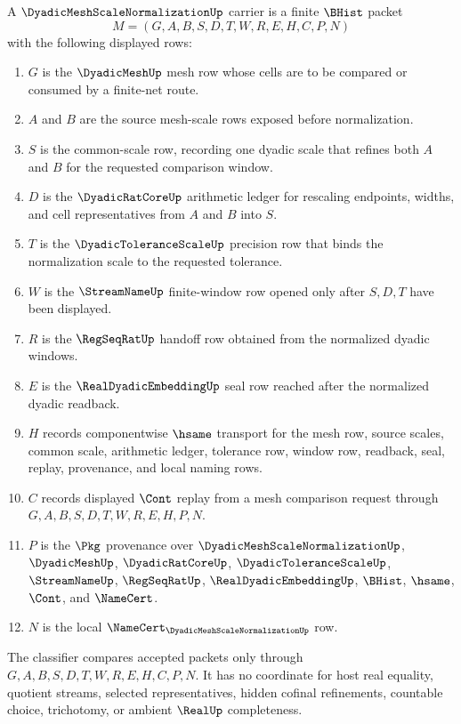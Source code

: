 \begin{definition}
\label{def:dyadic-mesh-scale-normalization-carrier}
A $\DyadicMeshScaleNormalizationUp$ carrier is a finite $\BHist$ packet
$$
M=(G,A,B,S,D,T,W,R,E,H,C,P,N)
$$
with the following displayed rows:
\begin{enumerate}
\item $G$ is the $\DyadicMeshUp$ mesh row whose cells are to be compared or consumed by a finite-net route.
\item $A$ and $B$ are the source mesh-scale rows exposed before normalization.
\item $S$ is the common-scale row, recording one dyadic scale that refines both $A$ and $B$ for the requested comparison window.
\item $D$ is the $\DyadicRatCoreUp$ arithmetic ledger for rescaling endpoints, widths, and cell representatives from $A$ and $B$ into $S$.
\item $T$ is the $\DyadicToleranceScaleUp$ precision row that binds the normalization scale to the requested tolerance.
\item $W$ is the $\StreamNameUp$ finite-window row opened only after $S,D,T$ have been displayed.
\item $R$ is the $\RegSeqRatUp$ handoff row obtained from the normalized dyadic windows.
\item $E$ is the $\RealDyadicEmbeddingUp$ seal row reached after the normalized dyadic readback.
\item $H$ records componentwise $\hsame$ transport for the mesh row, source scales, common scale, arithmetic ledger, tolerance row, window row, readback, seal, replay, provenance, and local naming rows.
\item $C$ records displayed $\Cont$ replay from a mesh comparison request through $G,A,B,S,D,T,W,R,E,H,P,N$.
\item $P$ is the $\Pkg$ provenance over $\DyadicMeshScaleNormalizationUp$, $\DyadicMeshUp$, $\DyadicRatCoreUp$, $\DyadicToleranceScaleUp$, $\StreamNameUp$, $\RegSeqRatUp$, $\RealDyadicEmbeddingUp$, $\BHist$, $\hsame$, $\Cont$, and $\NameCert$.
\item $N$ is the local $\NameCert_{\DyadicMeshScaleNormalizationUp}$ row.
\end{enumerate}
The classifier compares accepted packets only through $G,A,B,S,D,T,W,R,E,H,C,P,N$. It has no coordinate for host real equality, quotient streams, selected representatives, hidden cofinal refinements, countable choice, trichotomy, or ambient $\RealUp$ completeness.
\end{definition}

